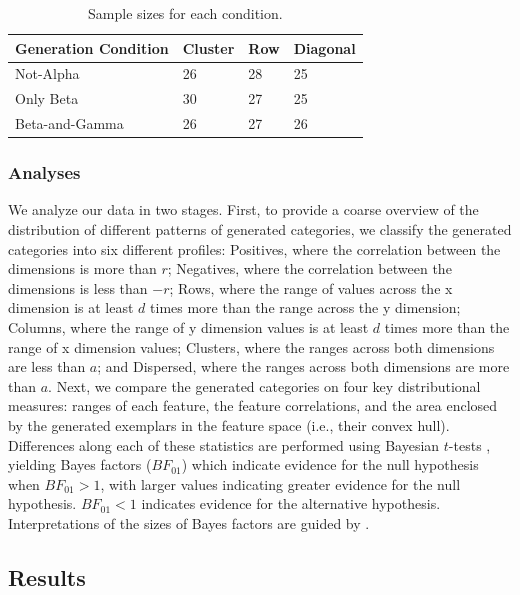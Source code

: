 \documentclass[10pt,letterpaper]{article}
\begin{document}
\begin{table}[H]
\begin{center} 
\caption{Sample sizes for each condition.} 
\label{table:samplesize} 
\vskip 0.12in
\begin{tabular}{llll} 
\hline
Generation Condition    &  Cluster & Row & Diagonal \\
\hline
Not-Alpha      &   26 & 28 & 25 \\
Only Beta      &   30 & 27 & 25 \\
Beta-and-Gamma &   26 & 27 & 26 \\
\hline
\end{tabular} 
\end{center} 
\end{table}

\subsubsection{Analyses}

We analyze our data in two stages. First, to provide a coarse overview of the distribution of different patterns of
generated categories, we classify the generated categories into six different profiles: Positives, where the correlation
between the dimensions is more than $r$; Negatives, where the correlation between the dimensions is less than $-r$;
Rows, where the range of values across the x dimension is at least $d$ times more than the range across the y dimension;
Columns, where the range of y dimension values is at least $d$ times more than the range of x dimension values;
Clusters, where the ranges across both dimensions are less than $a$; and Dispersed, where the ranges across both
dimensions are more than $a$. Next, we compare the generated categories on four key distributional measures: ranges of
each feature, the feature correlations, and the area enclosed by the generated exemplars in the feature space (i.e.,
their convex hull). Differences along each of these statistics are performed using Bayesian $t$-tests
\citep{rouder2009bayesian}, yielding Bayes factors ($BF_{01}$) which indicate evidence for the null hypothesis when
$BF_{01} > 1$, with larger values indicating greater evidence for the null hypothesis. $BF_{01} < 1$ indicates evidence
for the alternative hypothesis. Interpretations of the sizes of Bayes factors are guided by \cite{jeffreys1961}.

\subsection{Results}
\end{document}
